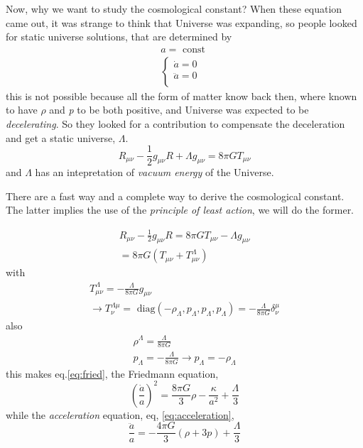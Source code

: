 Now, why we want to study the cosmological constant? When these equation came out, it was strange to think that Universe was expanding, so people looked for static universe solutions, that are determined by
\begin{gather*}
a = \text{ const }\\
\begin{cases}
\dot{a} = 0 \\
\ddot{a} = 0 \\
\end{cases}
\end{gather*}
this is not possible because all the form of matter know back then, where known to have $\rho $ and \emph{p} to be both positive, and Universe was expected to be \emph{decelerating}. So they looked for a contribution to compensate the deceleration and get a static universe, $\Lambda $.
\[
 R_{\mu \nu } - \frac{1}{2} g_{\mu \nu }R + \Lambda g_{\mu \nu } = 8\pi GT_{\mu \nu }
\]
and $\Lambda $ has an intepretation of \emph{vacuum energy} of the Universe.

There are a fast way and a complete way to derive the cosmological constant. The latter implies the use of the \emph{principle of least action}, we will do the former.

\begin{gather*}
R_{\mu \nu }- \frac{1}{2}g_{\mu \nu }R = 8\pi GT_{\mu \nu }- \Lambda g_{\mu \nu } \\
= 8\pi G \left( T_{\mu \nu }+ T_{\mu \nu }^{\Lambda } \right)
\end{gather*}
with 
\begin{gather*}
T^{\Lambda }_{\mu \nu } = - \frac{\Lambda }{8\pi G} g_{\mu \nu } \\
\to  T^{\Lambda \mu }_{\nu } = \text{ diag}\left( -\rho _{\Lambda }, p_{\Lambda },p_{\Lambda },p_{\Lambda } \right) = - \frac{\Lambda }{8\pi G} \delta ^{\mu }_{\nu }
\end{gather*}
also
\begin{gather*}
\rho ^{\Lambda } = \frac{\Lambda }{8\pi G} \\
p_{\Lambda } = - \frac{\Lambda }{8\pi G}
\to  p_{\Lambda } = - \rho _{\Lambda }
\end{gather*}
this makes eq.\ref{eq:fried}, the Friedmann equation,
\[
	\left( \frac{\dot{a}}{a} \right)^{2} = \frac{8\pi G}{3}\rho - \frac{\kappa }{a^{2}} + \frac{\Lambda }{3}
\]
while the \emph{acceleration} equation, eq, \ref{eq:acceleration},
\[
\frac{\ddot{a}}{a} = - \frac{4\pi G}{3}\left( \rho +3p \right) + \frac{\Lambda }{3}
\]
